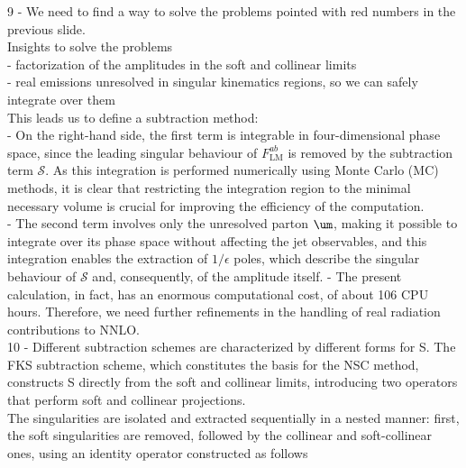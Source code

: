 \documentclass{article}
\begin{document}
9 - We need to find a way to solve the problems pointed with red numbers in the previous slide. \\
Insights to solve the problems \\
- factorization of the amplitudes in the soft and collinear limits  \\
- real emissions unresolved in singular kinematics regions, so we can safely integrate over them \\
This leads us to define a subtraction method: \\
- On the right-hand side, the first term is integrable in four-dimensional phase space, since the leading singular behaviour of $F^{ab}_{\mathrm{LM}}$ is removed by the subtraction term $\mathcal{S}$. As this integration is performed numerically using Monte Carlo (MC) methods, it is clear that restricting the integration region to the minimal necessary volume is crucial for improving the efficiency of the computation.\\
- The second term involves only the unresolved parton $\um$, making it possible to integrate over its phase space without affecting the jet observables, and this integration enables the extraction of $1/\epsilon$ poles, which describe the singular behaviour of $\mathcal{S}$ and, consequently, of the amplitude itself. 
- The present calculation, in fact, has an enormous computational cost, of about 106 CPU hours. Therefore, we need further refinements in the handling of real radiation contributions to NNLO.\\

10 - Different subtraction schemes are characterized by different forms for S.
The FKS subtraction scheme, which constitutes the basis for the NSC method, constructs S
directly from the soft and collinear limits, introducing two operators that perform soft and collinear projections. \\
The singularities are isolated and extracted sequentially in a nested manner: first, the soft
singularities are removed, followed by the collinear and soft-collinear ones, using an identity
operator constructed as follows
\end{document}
